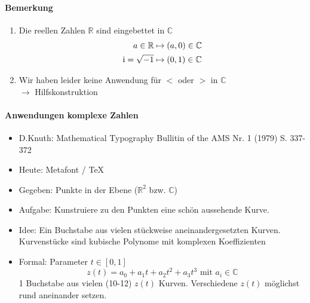 \paragraph{Bemerkung}
\begin{enumerate}

\item Die reellen Zahlen $\mathbb{R}$ sind eingebettet in $\mathbb{C}$
\begin{align*}
a \in \mathbb{R} & \mapsto (a, 0) \in \mathbb{C}\\
\operatorname{i} = \sqrt{-1} & \mapsto (0, 1)  \in \mathbb{C}
\end{align*}

\item Wir haben leider keine Anwendung für $<$ oder $>$ in $\mathbb{C}$\\
$\rightarrow$ Hilfskonstruktion

\end{enumerate}

\paragraph{Anwendungen komplexe Zahlen}
\begin{itemize}
\item D.Knuth: Mathematical Typography Bullitin of the AMS Nr. 1 (1979) S. 337- 372
\item Heute: Metafont / \TeX{}
\item Gegeben: Punkte in der Ebene ($\mathbb{R}^2$ bzw. $\mathbb{C}$)
\item Aufgabe: Kunstruiere zu den Punkten eine schön aussehende Kurve.
\item Idee: Ein Buchstabe aus vielen stückweise aneinandergesetzten Kurven. Kurvenstücke sind kubische Polynome mit komplexen Koeffizienten
\item Formal: Parameter $ t \in [0,1] $ \\
$$ z(t) = a_0 + a_1 t + a_2 t^2 + a_3 t^3 \text{ mit }  a_i \in \mathbb{C}$$
1 Buchstabe aus vielen (10-12) $z(t)$ Kurven. Verschiedene $z(t)$ möglichst \glqq rund\grqq
 aneinander setzen.
\end{itemize}

